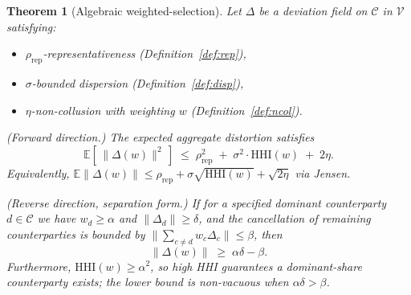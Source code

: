 \documentclass{article}
\newtheorem{theorem}{Theorem}
\newcommand{\HHI}{\mathrm{HHI}}
\begin{document}
\begin{theorem}[Algebraic weighted-selection]
\label{thm:algebraic-selection}
Let $\Delta$ be a deviation field on $\mathcal{C}$ in
$\mathcal{V}$ satisfying:
\begin{itemize}
\item $\rho_\mathrm{rep}$-representativeness
  (Definition~\ref{def:rep}),
\item $\sigma$-bounded dispersion (Definition~\ref{def:disp}),
\item $\eta$-non-collusion with weighting $w$
  (Definition~\ref{def:ncol}).
\end{itemize}

\emph{(Forward direction.)} The expected aggregate distortion
satisfies
\begin{equation}
\label{eq:forward-bound}
  \mathbb{E}\!\left[\,\|\Delta(w)\|^2\,\right]
  \;\leq\;
  \rho_\mathrm{rep}^2 \;+\; \sigma^2 \cdot \HHI(w) \;+\; 2\eta.
\end{equation}
Equivalently, $\mathbb{E}\|\Delta(w)\| \leq \rho_\mathrm{rep} +
\sigma \sqrt{\HHI(w)} + \sqrt{2\eta}$ via Jensen.

\emph{(Reverse direction, separation form.)} If for a specified
\emph{dominant counterparty} $d \in \mathcal{C}$ we have
$w_d \geq \alpha$ and $\|\Delta_d\| \geq \delta$, and the
\emph{cancellation} of remaining counterparties is bounded by
$\big\|\sum_{c \neq d} w_c \Delta_c\big\| \leq \beta$, then
\begin{equation}
\label{eq:reverse-bound}
  \|\Delta(w)\| \;\geq\; \alpha \delta - \beta.
\end{equation}
Furthermore, $\HHI(w) \geq \alpha^2$, so high HHI guarantees a
dominant-share counterparty exists; the lower bound is non-vacuous
when $\alpha \delta > \beta$.
\end{theorem}
\end{document}
